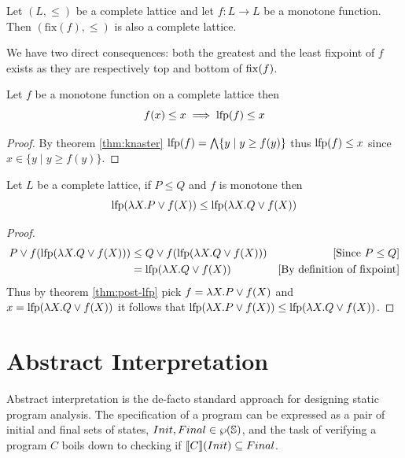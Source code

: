 \documentclass[
  10pt,       %
  twoside,    %
  a4paper,    %
  english,    %
  tikz,       %
  openright,  %
]{book}
\begin{document}
\begin{theorem}
  \label{thm:knaster}
  Let $(L, \leq)$ be a complete lattice and let $f : L \to L$ be a monotone 
  function. Then $(\text{fix}(f), \leq)$ is also a complete lattice.
\end{theorem}

We have two direct consequences: both the greatest and the least fixpoint of
$f$ exists as they are respectively top and bottom of $\mathrm{fix}(f)$.

\begin{theorem}
  \label{thm:post-lfp}
  Let $f$ be a monotone function on a complete lattice then
  $$f(x) \leq x \implies \mathrm{lfp}(f) \leq x$$
\end{theorem}
\begin{proof}
  By theorem \ref{thm:knaster} $\mathrm{lfp}(f) = \bigwedge\{ y \mid y \geq f(y) \}$
  thus $\mathrm{lfp}(f) \leq x$ since $x \in \{ y \mid y \geq f(y) \}$.
\end{proof}

\begin{theorem}
  \label{thm:lfp-mono}
  Let $L$ be a complete lattice, if $P \leq Q$ and $f$ is monotone then
  $$\mathrm{lfp}(\lambda X. P \lor f(X)) \leq \mathrm{lfp}(\lambda X. Q \lor f(X))$$
\end{theorem}
\begin{proof}
  \begin{align*}
    P \lor f(\mathrm{lfp}(\lambda X . Q \lor f(X)))
      &\leq Q \lor f(\mathrm{lfp}(\lambda X . Q \lor f(X)))
      &\text{[Since $P \leq Q$]} \\
      &= \mathrm{lfp}(\lambda X . Q \lor f(X))
      &\text{[By definition of fixpoint]} \\
  \end{align*}
  Thus by theorem \ref{thm:post-lfp} pick $f = \lambda X . P \lor f(X)$ and
  $x = \mathrm{lfp}(\lambda X. Q \lor f(X))$ it follows that
  $\mathrm{lfp}(\lambda X. P \lor f(X)) \leq \mathrm{lfp}(\lambda X. Q \lor f(X))$.
\end{proof}

\section{Abstract Interpretation}

Abstract interpretation \cite{Cousot77, Cousot21} is the de-facto standard
approach for designing static program analysis. The specification of a program
can be expressed as a pair of initial and final sets of states, $Init, Final
\in \wp(\mathbb{S})$, and the task of verifying a program $C$ boils down to
checking if $\llbracket C \rrbracket(Init) \subseteq Final$.
\end{document}
